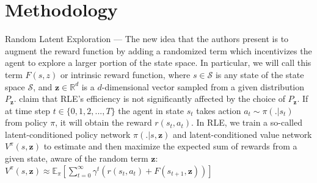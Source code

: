 \documentclass[10pt]{article} %
\begin{document}
\section{Methodology}
Random Latent Exploration --- The new idea that the authors \cite{rle-paper} present is to augment the reward function by adding a randomized term which incentivizes the agent to explore a larger portion of the state space. In particular, we will call this term $F(s, z)$ or intrinsic reward function, where $s \in \mathcal{S}$ is any state of the state space $\mathcal{S}$, and $\textbf{z} \in \mathbb{R}^{d}$ is a $d$-dimensional vector sampled from a given distribution $P_{\textbf{z}}$. \cite{rle-paper} claim that \textsc{RLE}'s efficiency is not significantly affected by the choice of $P_{\textbf{z}}$. If at time step $t \in \{0, 1, 2, ..., T\}$ the agent in state $s_{t}$ takes action $a_{t} \sim \pi(. | s_{t})$ from policy $\pi$, it will obtain the reward $r (s_{t}, a_{t})$. In \textsc{RLE}, we train a so-called latent-conditioned policy network $\pi(. | s, \textbf{z})$ and latent-conditioned value network $V^{\pi}(s, \textbf{z})$ to estimate and then maximize the expected sum of rewards from a given state, aware of the random term $\textbf{z}$: $V^{\pi}(s, \textbf{z}) \approx \mathbb{E}_{\pi} \left[\sum_{t = 0}^{\infty} \gamma^{t} \left(r(s_{t}, a_{t}) + F(s_{t+1}, \textbf{z})\right) \right]$
\end{document}
